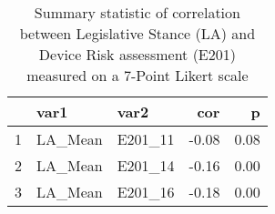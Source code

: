 \begin{table}[ht]
\centering
\begin{tabular}{rllrr}
  \hline
 & var1 & var2 & cor & p \\ 
  \hline
1 & LA\_Mean & E201\_11 & -0.08 & 0.08 \\ 
  2 & LA\_Mean & E201\_14 & -0.16 & 0.00 \\ 
  3 & LA\_Mean & E201\_16 & -0.18 & 0.00 \\ 
   \hline
\end{tabular}
\caption{Summary statistic of correlation between Legislative Stance (LA) and Device Risk assessment (E201) measured on a 7-Point Likert scale} 
\label{RQ1_H3_DeviceRiskLAInteresting}
\end{table}
